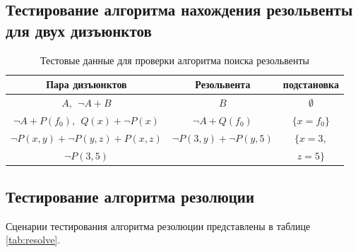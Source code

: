 \subsection{Тестирование алгоритма нахождения резольвенты для двух дизъюнктов}


\begin{table}[h!]
    \centering
    \caption{Тестовые данные для проверки алгоритма поиска резольвенты}
    \label{tab:resolve1}
    \begin{tabular}{|c|c|c|}
        \hline
        Пара дизъюнктов & Резольвента & подстановка \\
        \hline
        \hline
        $A,~~\neg A + B$ & $B$ & $\emptyset$ \\
        \hline
        $\neg A + P(f_0),~~Q(x) + \neg P(x)$ & $\neg A + Q(f_0)$ & $\{x=f_0\}$ \\
        \hline
        $\neg P(x, y) + \neg P(y, z) + P(x, z)$ & $\neg P(3, y) + \neg P(y, 5)$ & $\{x=3,$ \\
        $\neg P(3, 5)$ & & $z=5\}$ \\
        \hline
    \end{tabular}
\end{table}

\subsection{Тестирование алгоритма резолюции}

Сценарии тестирования алгоритма резолюции представлены в таблице \ref{tab:resolve}.

